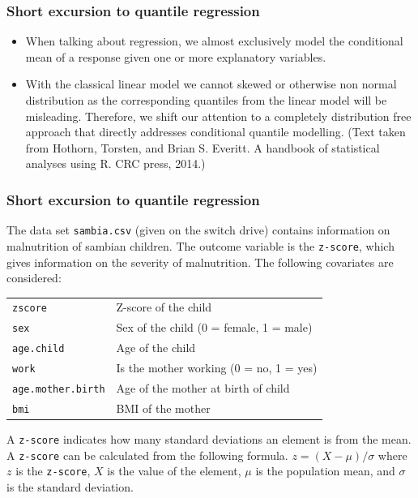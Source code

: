 \documentclass{beamer}\usepackage[]{graphicx}\usepackage[]{color}
\begin{document}
{{{%
\usebackgroundtemplate{}
\begin{frame}
\frametitle{Short excursion to quantile regression}
\begin{itemize}
\setlength\itemsep{1.5em}
\item When talking about regression, we almost exclusively model the conditional
mean of a response given one or more explanatory variables.
\item With the classical linear model we cannot skewed or otherwise non
normal distribution as the corresponding quantiles from the linear model
will be misleading. Therefore, we shift our attention to a completely
distribution free approach that directly addresses conditional quantile
modelling. \newline
(Text taken from Hothorn, Torsten, and Brian S. Everitt. A handbook of
statistical analyses using R. CRC press, 2014.)
\end{itemize}
\end{frame}

\usebackgroundtemplate{}
\begin{frame}[fragile]
\frametitle{Short excursion to quantile regression}
The data set \texttt{sambia.csv} (given on the switch drive) contains information
on malnutrition of sambian children. The outcome variable is the \texttt{z-score},
which gives information on the severity of malnutrition. \newline
The following covariates are considered:
\begin{center}
\begin{tabular}{ll}
\hline
\texttt{zscore} & Z-score of the child\\
\texttt{sex} & Sex of the child (0 = female, 1 = male)\\
\texttt{age.child} & Age of the child\\
\texttt{work} & Is the mother working (0 = no, 1 = yes)\\
\texttt{age.mother.birth} & Age of the mother at birth of child\\
\texttt{bmi} & BMI of the mother\\
\hline
\end{tabular}
\end{center}
A \texttt{z-score} indicates how many standard deviations an element is from the mean. A \texttt{z-score} can be calculated from the following formula. $z = (X - \mu) / \sigma$ where $z$ is the \texttt{z-score}, $X$ is the value of the element, $\mu$ is the population mean, and $\sigma$ is the standard deviation.
\end{frame}



}}}
\end{document}
